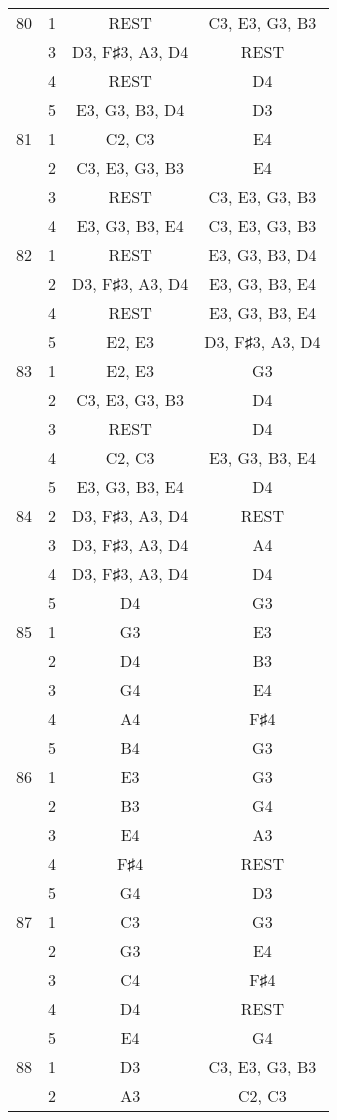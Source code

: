 \documentclass{article}
\begin{document}
\begin{longtable}{|c|c|c|c|}
\hline
80 & 1 & REST & C3, E3, G3, B3 \\ 
  & 3 & D3, F♯3, A3, D4 & REST \\ 
  & 4 & REST & D4 \\ 
  & 5 & E3, G3, B3, D4 & D3 \\ 
\hline
81 & 1 & C2, C3 & E4 \\ 
  & 2 & C3, E3, G3, B3 & E4 \\ 
  & 3 & REST & C3, E3, G3, B3 \\ 
  & 4 & E3, G3, B3, E4 & C3, E3, G3, B3 \\ 
\hline
82 & 1 & REST & E3, G3, B3, D4 \\ 
  & 2 & D3, F♯3, A3, D4 & E3, G3, B3, E4 \\ 
  & 4 & REST & E3, G3, B3, E4 \\ 
  & 5 & E2, E3 & D3, F♯3, A3, D4 \\ 
\hline
83 & 1 & E2, E3 & G3 \\ 
  & 2 & C3, E3, G3, B3 & D4 \\ 
  & 3 & REST & D4 \\ 
  & 4 & C2, C3 & E3, G3, B3, E4 \\ 
  & 5 & E3, G3, B3, E4 & D4 \\ 
\hline
84 & 2 & D3, F♯3, A3, D4 & REST \\ 
  & 3 & D3, F♯3, A3, D4 & A4 \\ 
  & 4 & D3, F♯3, A3, D4 & D4 \\ 
  & 5 & D4 & G3 \\ 
\hline
85 & 1 & G3 & E3 \\ 
  & 2 & D4 & B3 \\ 
  & 3 & G4 & E4 \\ 
  & 4 & A4 & F♯4 \\ 
  & 5 & B4 & G3 \\ 
\hline
86 & 1 & E3 & G3 \\ 
  & 2 & B3 & G4 \\ 
  & 3 & E4 & A3 \\ 
  & 4 & F♯4 & REST \\ 
  & 5 & G4 & D3 \\ 
\hline
87 & 1 & C3 & G3 \\ 
  & 2 & G3 & E4 \\ 
  & 3 & C4 & F♯4 \\ 
  & 4 & D4 & REST \\ 
  & 5 & E4 & G4 \\ 
\hline
88 & 1 & D3 & C3, E3, G3, B3 \\ 
  & 2 & A3 & C2, C3 \\ 

\end{longtable}
\end{document}
